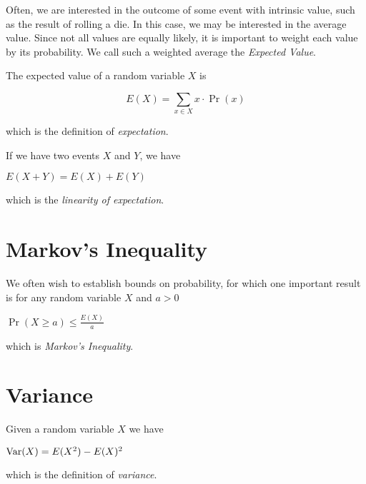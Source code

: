 Often, we are interested in the outcome of some event with intrinsic
value, such as the result of rolling a die.  In this case, we may be
interested in the average value.  Since not all values are equally
likely, it is important to weight each value by its probability.  We
call such a weighted average the \emph{Expected Value}.

The expected value of a random variable $X$ is

\begin{displaymath}
  E(X) = \sum_{x \in X} x \cdot \Pr(x)
\end{displaymath}

which is the definition of \emph{expectation}.

If we have two events $X$ and $Y$, we have

\begin{center}
\begin{math}
  E(X + Y) = E(X) + E(Y)
\end{math}
\end{center}

which is the \emph{linearity of expectation}.

\section{Markov's Inequality}

We often wish to establish bounds on probability, for which one
important result is for any random variable $X$ and $a > 0$

\begin{center}
\begin{math}
  \Pr(X \geq a) \leq \frac{E(X)}{a}
\end{math}
\end{center}

which is \emph{Markov's Inequality}.

\section{Variance}

Given a random variable $X$ we have

\begin{center}
  \begin{math}
    \text{Var} (X) = E(X^2) - E(X)^2    
  \end{math}
\end{center}

which is the definition of \emph{variance}.

